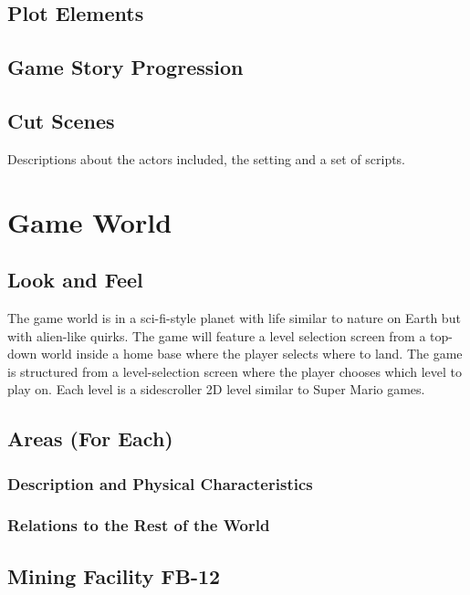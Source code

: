 \documentclass[12pt]{article}
\begin{document}
\subsection{Plot Elements}

\subsection{Game Story Progression}

\subsection{Cut Scenes}

Descriptions about the actors included, the setting and a set of scripts.

\section{Game World}

\subsection{Look and Feel}

The game world is in a sci-fi-style planet with life similar to nature on Earth but with alien-like quirks. The game will feature a level selection screen from a top-down world inside a home base where the player selects where to land. The game is structured from a level-selection screen where the player chooses which level to play on. Each level is a sidescroller 2D level similar to Super Mario games. 

\subsection{Areas (For Each)}

\subsubsection{Description and Physical Characteristics}

\subsubsection{Relations to the Rest of the World}

\subsection{Mining Facility FB-12}
\end{document}
